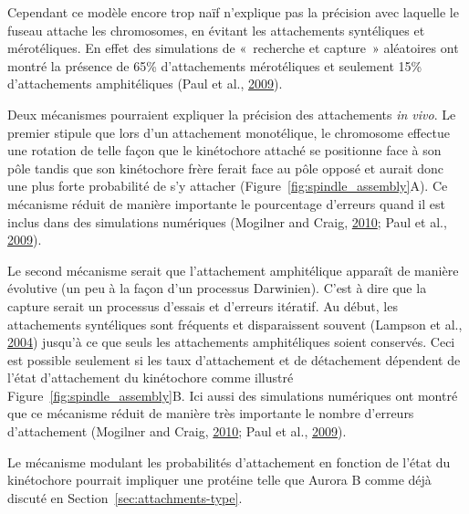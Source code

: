 \documentclass[12pt,a4paper,twoside,openright]{book}
\begin{document}
Cependant ce modèle encore trop naïf n'explique pas la précision avec
laquelle le fuseau attache les chromosomes, en évitant les attachements
syntéliques et mérotéliques. En effet des simulations de «~recherche et
capture~» aléatoires ont montré la présence de 65\% d'attachements
mérotéliques et seulement 15\% d'attachements amphitéliques (Paul et
al., \protect\hyperlink{ref-Paul2009}{2009}).

Deux mécanismes pourraient expliquer la précision des attachements
\emph{in vivo}. Le premier stipule que lors d'un attachement
monotélique, le chromosome effectue une rotation de telle façon que le
kinétochore attaché se positionne face à son pôle tandis que son
kinétochore frère ferait face au pôle opposé et aurait donc une plus
forte probabilité de s'y attacher (Figure~\ref{fig:spindle_assembly}A).
Ce mécanisme réduit de manière importante le pourcentage d'erreurs quand
il est inclus dans des simulations numériques (Mogilner and Craig,
\protect\hyperlink{ref-Mogilner2010}{2010}; Paul et al.,
\protect\hyperlink{ref-Paul2009}{2009}).

Le second mécanisme serait que l'attachement amphitélique apparaît de
manière évolutive (un peu à la façon d'un processus Darwinien). C'est à
dire que la capture serait un processus d'essais et d'erreurs itératif.
Au début, les attachements syntéliques sont fréquents et disparaissent
souvent (Lampson et al., \protect\hyperlink{ref-Lampson2004}{2004})
jusqu'à ce que seuls les attachements amphitéliques soient conservés.
Ceci est possible seulement si les taux d'attachement et de détachement
dépendent de l'état d'attachement du kinétochore comme illustré
Figure~\ref{fig:spindle_assembly}B. Ici aussi des simulations numériques
ont montré que ce mécanisme réduit de manière très importante le nombre
d'erreurs d'attachement (Mogilner and Craig,
\protect\hyperlink{ref-Mogilner2010}{2010}; Paul et al.,
\protect\hyperlink{ref-Paul2009}{2009}).

Le mécanisme modulant les probabilités d'attachement en fonction de
l'état du kinétochore pourrait impliquer une protéine telle que Aurora B
comme déjà discuté en Section~\ref{sec:attachments-type}.
\end{document}
